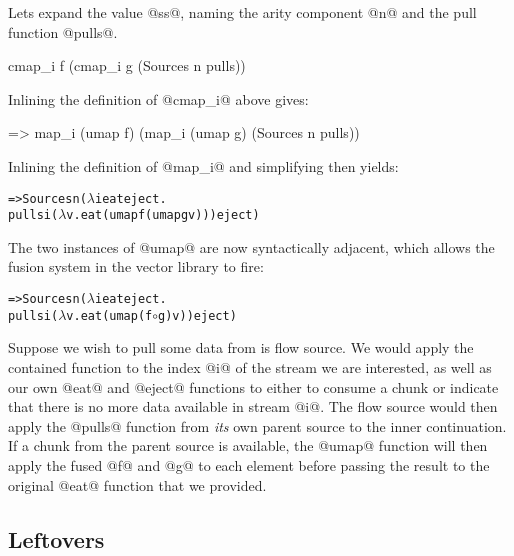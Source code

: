 Lets expand the value @ss@, naming the arity component @n@ and the pull function @pulls@.
\begin{code}
   cmap_i f (cmap_i g (Sources n pulls))
\end{code}

Inlining the definition of @cmap_i@ above gives:
\begin{code}
=> map_i (umap f) (map_i (umap g) (Sources n pulls))
\end{code}

Inlining the definition of @map_i@ and simplifying then yields:
\begin{alltt}
=> Sources n (\(\lambda\)i eat eject.
     pulls i (\(\lambda\)v. eat (umap f (umap g v))) eject)
\end{alltt}
The two instances of @umap@ are now syntactically adjacent, which allows the fusion system in the vector library to fire:

\begin{alltt}
=> Sources n (\(\lambda\)i eat eject.
     pulls i (\(\lambda\)v. eat (umap (f \(\circ\) g) v)) eject)
\end{alltt}

Suppose we wish to pull some data from is flow source. We would apply the contained function to the index @i@ of the stream we are interested, as well as our own @eat@ and @eject@ functions to either to consume a chunk or indicate that there is no more data available in stream @i@. The flow source would then apply the @pulls@ function from \emph{its} own parent source to the inner continuation. If a chunk from the parent source is available, the @umap@ function will then apply the fused @f@ and @g@ to each element before passing the result to the original @eat@ function that we provided.


\subsection{Leftovers}

